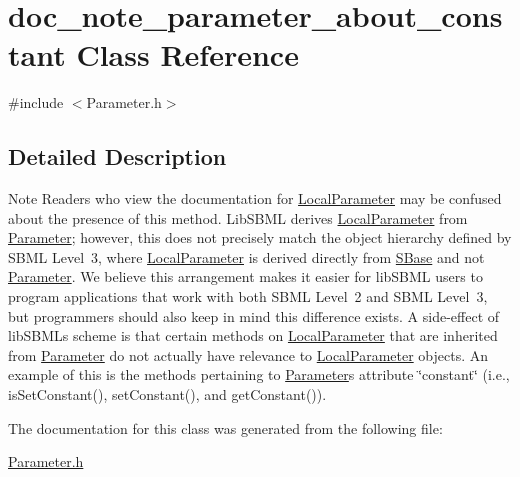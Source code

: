 \hypertarget{classdoc__note__parameter__about__constant}{}\section{doc\+\_\+note\+\_\+parameter\+\_\+about\+\_\+constant Class Reference}
\label{classdoc__note__parameter__about__constant}


{\ttfamily \#include $<$Parameter.\+h$>$}



\subsection{Detailed Description}
\begin{DoxyNote}{Note}
Readers who view the documentation for \hyperlink{class_local_parameter}{Local\+Parameter} may be confused about the presence of this method. Lib\+S\+B\+ML derives \hyperlink{class_local_parameter}{Local\+Parameter} from \hyperlink{class_parameter}{Parameter}; however, this does not precisely match the object hierarchy defined by S\+B\+ML Level~3, where \hyperlink{class_local_parameter}{Local\+Parameter} is derived directly from \hyperlink{class_s_base}{S\+Base} and not \hyperlink{class_parameter}{Parameter}. We believe this arrangement makes it easier for lib\+S\+B\+ML users to program applications that work with both S\+B\+ML Level~2 and S\+B\+ML Level~3, but programmers should also keep in mind this difference exists. A side-\/effect of lib\+S\+B\+ML\textquotesingle{}s scheme is that certain methods on \hyperlink{class_local_parameter}{Local\+Parameter} that are inherited from \hyperlink{class_parameter}{Parameter} do not actually have relevance to \hyperlink{class_local_parameter}{Local\+Parameter} objects. An example of this is the methods pertaining to \hyperlink{class_parameter}{Parameter}\textquotesingle{}s attribute \char`\"{}constant\char`\"{} (i.\+e., is\+Set\+Constant(), set\+Constant(), and get\+Constant()). 
\end{DoxyNote}


The documentation for this class was generated from the following file\+:\begin{DoxyCompactItemize}
\item 
\hyperlink{_parameter_8h}{Parameter.\+h}\end{DoxyCompactItemize}
